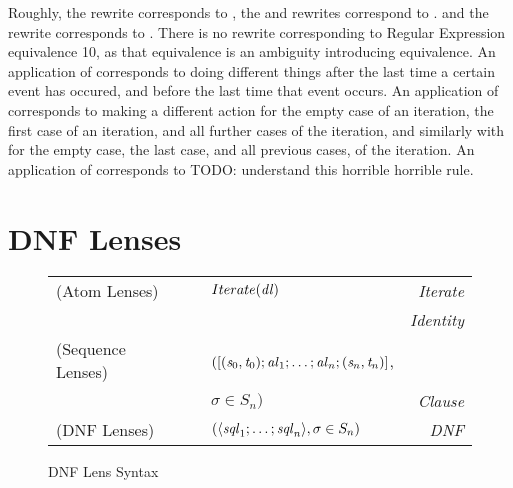 Roughly, the \AtomSumstarRule{} rewrite corresponds to \SumstarRule{},
the \AtomUnrollstarLeftRule{} and \AtomUnrollstarRightRule{} rewrites correspond to \ProductstarRule{}.
and the \DicyclicRewriteStarRule{} rewrite corresponds to \DicyclicityRule{}.
There is no rewrite corresponding to Regular Expression equivalence 10, as that
equivalence is an ambiguity introducing equivalence.
An application of \AtomSumstarRule{} corresponds to doing different things after the last time a certain event has occured, and before the last time that event occurs.
An application of \AtomUnrollstarLeftRule{} corresponds to making a different action for
the empty case of an iteration, the first case of an iteration, and all further cases of the iteration,
and similarly with \AtomUnrollstarRightRule{} for the empty case, the last case, and all previous cases, of the iteration.
An application of \DicyclicRewriteStarRule{} corresponds to TODO: understand this
horrible horrible rule.

\section{DNF Lenses}

\begin{figure}
\centering
\begin{tabular}{@{}l@{\ }l@{\ }c@{}l@{\ }>{\itshape\/}r@{}}
(Atom Lenses) &\AtomLens{} & \GEq{} & $Iterate(\mathit{dl})$ & Iterate\\
& & & \GBar{} \IdentityLens{} & Identity\\
(Sequence Lenses) &\SequenceLens{} & \GEq{} &
$([(\mathit{s}_0,\mathit{t}_0);\mathit{al}_1;\ldots;\mathit{al}_n;(\mathit{s}_n,\mathit{t}_n)]$, &\\
& & & $\sigma \in S_n)$ & Clause\SubN{}\\
(DNF Lenses)& \DNFLens{} & \GEq{} & $(\langle\mathit{sql}_1;\ldots;\mathit{sql}_n\rangle, \sigma \in S_n)$ & DNF\SubN{}\\
\end{tabular}
\caption{DNF Lens Syntax}
\label{fig:dnf-lens-syntax}
\end{figure}

